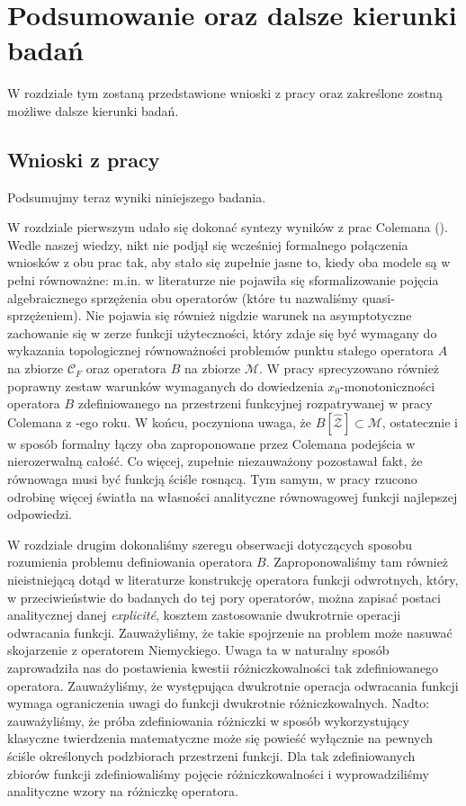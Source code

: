 \chapter{Podsumowanie oraz dalsze kierunki badań}\label{chap_conclusions}

	W rozdziale tym zostaną przedstawione wnioski z pracy oraz zakreślone zostną możliwe dalsze kierunki badań. 


\section*{Wnioski z pracy}

	
	Podsumujmy teraz wyniki niniejszego badania. 
	
	W rozdziale pierwszym udało się dokonać syntezy wyników z prac Colemana (\citeyear{Coleman1,Coleman2}). Wedle naszej wiedzy, nikt nie podjął się wcześniej formalnego połączenia wniosków z obu prac tak, aby stało się zupełnie jasne to, kiedy oba modele są w pełni równoważne: m.in. w literaturze nie pojawiła się sformalizowanie pojęcia algebraicznego sprzężenia obu operatorów (które tu nazwaliśmy quasi-sprzężeniem). Nie pojawia się również nigdzie warunek na asymptotyczne zachowanie się w zerze funkcji użyteczności, który zdaje się być wymagany do wykazania topologicznej równoważności problemów punktu stałego operatora $A$ na zbiorze $\mathcal{C}_F$ oraz operatora $B$ na zbiorze $\mathcal{M}$. W pracy sprecyzowano również poprawny zestaw warunków wymaganych do dowiedzenia $x_0$-monotoniczności operatora $B$ zdefiniowanego na przestrzeni funkcyjnej rozpatrywanej w pracy Colemana z \citeyear{Coleman2}-ego roku. W końcu, poczyniona uwaga, że $B[\hat{\mathcal{Z}}] \subset \mathcal{M}$, ostatecznie i w sposób formalny łączy oba zaproponowane przez Colemana podejścia w nierozerwalną całość. Co więcej, zupełnie niezauważony pozostawał fakt, że równowaga musi być funkcją ściśle rosnącą. Tym samym, w pracy rzucono odrobinę więcej światła na własności analityczne równowagowej funkcji najlepszej odpowiedzi. 
	
	W rozdziale drugim dokonaliśmy szeregu obserwacji dotyczących sposobu rozumienia problemu definiowania operatora $B$. Zaproponowaliśmy tam również nieistniejącą dotąd w literaturze konstrukcję operatora funkcji odwrotnych, który, w przeciwieństwie do badanych do tej pory operatorów, można zapisać postaci analitycznej danej {\it explicit\' e}, kosztem zastosowanie dwukrotrnie operacji odwracania funkcji. Zauważyliśmy, że takie spojrzenie na problem może nasuwać skojarzenie z operatorem Niemyckiego. Uwaga ta w naturalny sposób zaprowadziła nas do postawienia kwestii różniczkowalności tak zdefiniowanego operatora. Zauważyliśmy, że występująca dwukrotnie operacja odwracania funkcji wymaga ograniczenia uwagi do funkcji dwukrotnie różniczkowalnych. Nadto: zauważyliśmy, że próba zdefiniowania różniczki w sposób wykorzystujący klasyczne twierdzenia matematyczne może się powieść wyłącznie na pewnych ściśle określonych podzbiorach przestrzeni funkcji. Dla tak zdefiniowanych zbiorów funkcji zdefiniowaliśmy pojęcie różniczkowalności i wyprowadziliśmy analityczne wzory na różniczkę operatora.   

